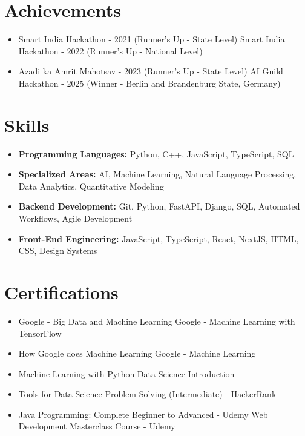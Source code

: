 \documentclass[a4paper,10pt]{article}
\begin{document}
\section*{Achievements}
\begin{itemize}
\item Smart India Hackathon - 2021 (Runner's Up - State Level) \hfill Smart India Hackathon - 2022 (Runner's Up - National Level)
\item Azadi ka Amrit Mahotsav - 2023 (Runner's Up - State Level) \hfill AI Guild Hackathon - 2025 (Winner - Berlin and Brandenburg State, Germany)
\end{itemize}

\section*{Skills}
\begin{itemize}
  \item \textbf{Programming Languages:} Python, C++, JavaScript, TypeScript, SQL
  \item \textbf{Specialized Areas:} AI, Machine Learning, Natural Language Processing, Data Analytics, Quantitative Modeling
  \item \textbf{Backend Development:} Git, Python, FastAPI, Django, SQL, Automated Workflows, Agile Development
  \item \textbf{Front-End Engineering:} JavaScript, TypeScript, React, NextJS, HTML, CSS, Design Systems
\end{itemize}

\section*{Certifications}
\begin{itemize}
\item Google - Big Data and Machine Learning \hfill Google - Machine Learning with TensorFlow
\item How Google does Machine Learning \hfill Google - Machine Learning
\item Machine Learning with Python \hfill Data Science Introduction
\item Tools for Data Science \hfill Problem Solving (Intermediate) - HackerRank
\item Java Programming: Complete Beginner to Advanced - Udemy \hfill Web Development Masterclass Course - Udemy
\end{itemize}
\end{document}
